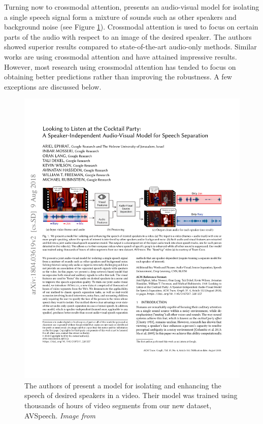Turning now to crossmodal attention, \citep{looking-to-listen} presents an audio-visual model for isolating a single speech signal form a mixture of sounds such as other speakers and background noise (see Figure \ref{fig:looking-to-listen}). Crossmodal attention is used to focus on certain parts of the audio with respect to an image of the desired speaker. The authors showed superior results compared to state-of-the-art audio-only methods. Similar works \citep{cross-transformer, crossmodal-object-detection, crossmodal-video-caption} are using crossmodal attention and have attained impressive results. However, most research using crossmodal attention has tended to focus on obtaining better predictions rather than improving the robustness. A few exceptions are discussed below.
\begin{figure}[!ht]
\centering
\includegraphics[scale=0.85]{figures/look-to-listen}
\caption[Looking to Listen framework]{The authors of \citep{looking-to-listen} present a model for isolating and enhancing the speech of desired speakers in a video. Their model was trained using thousands of hours of video segments from our new dataset, AVSpeech. \textit{Image from} \citep{looking-to-listen}}
\label{fig:looking-to-listen}
\end{figure}

